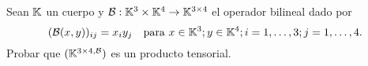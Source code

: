 \item Sean $\mathbb{K}$ un cuerpo y $\mathcal{B}:\mathbb{K}^3\times\mathbb{K}^4\to\mathbb{K}^{3\times4}$ el operador bilineal dado por \[(\mathcal{B}(x,y))_{ij}=x_iy_j\quad\text{para }x\in\mathbb{K}^3;y\in\mathbb{K}^4;i=1,\dots,3;j=1,\dots,4.\]
    Probar que $(\mathbb{K}^{3\times4,\mathcal{B}})$ es un producto tensorial.
    \begin{mdframed}[style=s]
        
    \end{mdframed}